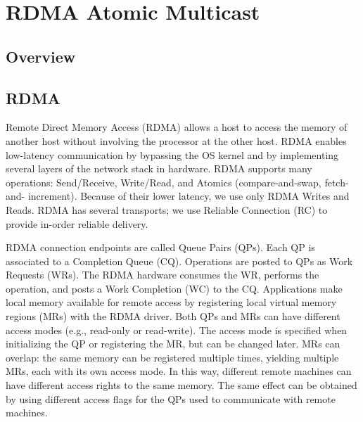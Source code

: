 
\section{RDMA Atomic Multicast}
\label{sec:rdma-atomic-multicast}

\subsection{Overview}

\subsection{RDMA}

Remote Direct Memory Access (RDMA) allows a host to access the memory of another host without involving the processor at the other host. RDMA enables low-latency communication by bypassing the OS kernel and by implementing several layers of the network stack in hardware.
RDMA supports many operations: Send/Receive, Write/Read, and Atomics (compare-and-swap, fetch-and- increment). Because of their lower latency, we use only RDMA Writes and Reads. RDMA has several transports; we use Reliable Connection (RC) to provide in-order reliable delivery.

RDMA connection endpoints are called Queue Pairs (QPs). Each QP is associated to a Completion Queue (CQ). Operations are posted to QPs as Work Requests (WRs). The RDMA hardware consumes the WR, performs the operation, and posts a Work Completion (WC) to the CQ. Applications make local memory available for remote access by registering local virtual memory regions (MRs) with the RDMA driver. Both QPs and MRs can have different access modes (e.g., read-only or read-write). The access mode is specified when initializing the QP or registering the MR, but can be changed later. MRs can overlap: the same memory can be registered multiple times, yielding multiple MRs, each with its own access mode. In this way, different remote machines can have different access rights to the same memory. The same effect can be obtained by using different access flags for the QPs used to communicate with remote machines.


